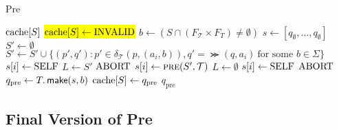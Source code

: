 \begin{algorithm}
\caption{Pre}\label{alg:pre}
\begin{algorithmic}[1]
\If{$\cache[S]$}
\Return $\cache[S]$
\EndIf
\State \hl{$\cache[S] \gets \invalid$}
\State $b \gets (S \cap (F_{\mathcal{T}} \times F_{T} ) \neq \emptyset)$
\State $s \gets [q_{\emptyset},\dots,q_{\emptyset}]$
\State $S' \gets \emptyset$
\State $S' \gets S' \cup \{ (p',q'): p' \in \delta_{\mathcal{T}}(p,(a_{i},b)), q'=\Succ(q,a_{i}) \ \text{for some $b \in \Sigma$} \}$
\EndFor
{}
\State $s[i] \gets \mathrm{SELF}$
\State $L \gets S'$
\Return $\mathrm{ABORT}$
\Else
\State $s[i] \gets \Call{pre}{S',\mathcal{T}}$
\State $L \gets \emptyset$
\State $s[i] \gets \mathrm{SELF}$
\Else
\Return $\mathrm{ABORT}$
\EndIf 
\EndIf
\EndIf
\EndFor
\State $q_{\text{pre}} \gets T.\operatorname{\textsf{make}}(s,b)$
\State $\mathrm{cache}[S] \gets q_{\text{pre}}$
\Return $q_{\text{pre}} $
\EndProcedure
\end{algorithmic}
\end{algorithm}

\subsection{Final Version of Pre}
